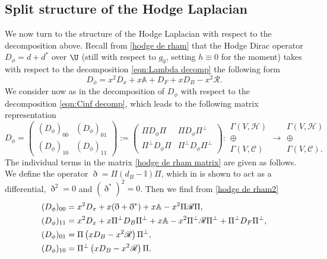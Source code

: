 \subsection{Split structure of the Hodge Laplacian} \label{subsec:split hodge}
We now turn to the structure of the Hodge Laplacian with respect to the decomposition above.
Recall from \eqref{hodge de rham} that the Hodge Dirac operator $D_\phi = d + d^{*}$ over $\U$
(still with respect to $g_0$, setting $h\equiv 0$ for the moment)
takes with respect to the decomposition \eqref{eqn:Lambda decomp} the following form
\begin{equation}\label{hodge de rham2}
D_\phi = x^{2}D_{x} + x \mathbb{A} + D_{F} + xD_{B}
-x^{2}\mathscr{R}.
\end{equation}
We consider now as in \cite{gravi-ins}
the decomposition of $D_\phi$ with respect to the
decomposition \eqref{eqn:Cinf decomp}, which leads to the following
matrix representation
\begin{equation}\label{hodge de rham matrix}
D_\phi =
\begin{pmatrix}
(D_\phi)_{00} & (D_\phi)_{01}\\
(D_\phi)_{10} & (D_\phi)_{11}
\end{pmatrix} :=
\begin{pmatrix}
\Pi D_\phi \Pi & \Pi D_\phi \Pi^{\bot}\\
\Pi^{\bot} D_\phi \Pi & \Pi^{\bot} D_\phi \Pi^{\bot}
\end{pmatrix}
:
\begin{matrix}
\Gamma(V,\mathscr{H}) \\ \oplus \\ \Gamma(V,\mathscr{C})
\end{matrix}
\to
\begin{matrix}
\Gamma(V,\mathscr{H}) \\ \oplus \\ \Gamma(V,\mathscr{C}).
\end{matrix}
\end{equation}
The individual terms in the matrix \eqref{hodge de rham matrix} are given as follows.
We define the operator $\eth = \Pi(d_{B} - \mathbb{I})\Pi$,
which in \cite[Prop.\,15]{gravi-ins} is shown to act as a differential, \ie $\eth^{2} =0$ and $(\eth^{*})^{2} = 0$.
Then we find from \eqref{hodge de rham2}
\begin{align}
&(D_\phi)_{00} =
x^2 D_{x} + x(\eth + \eth^{*}) + x \mathbb{A} - x^{2} \Pi \mathscr{R}\Pi,\\
& (D_\phi)_{11} =
x^{2}D_{x} + x \Pi^{\bot}D_{B}\Pi^{\bot} + x \mathbb{A} - x^{2}\Pi^{\bot} \mathscr{R} \Pi^{\bot} + \Pi^{\bot} D_F \Pi^{\bot},\\\label{D_{01}}
&(D_\phi)_{01} =
\Pi\left(xD_{B} - x^{2} \mathscr{R}\right) \Pi^{\bot},\\ \label{D_{10}}
&(D_\phi)_{10} =
\Pi^{\bot}\left(xD_{B} - x^{2} \mathscr{R}\right) \Pi.
\end{align}
